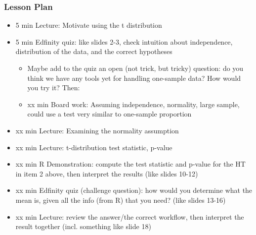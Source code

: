 \begin{frame}
    \frametitle{Lesson Plan}
    \begin{itemize}
        \item 5 min Lecture: Motivate using the t distribution
        \item 5 min Edfinity quiz: like slides 2-3, check intuition about independence, distribution of the data, and the correct hypotheses
        \begin{itemize} 
            \item Maybe add to the quiz an open (not trick, but tricky) question: do you think we have any tools yet for handling one-sample data? How would you try it? Then:
            \item xx min Board work: Assuming independence, normality, large sample, could use a test very similar to one-sample proportion
        \end{itemize}
        \item xx min Lecture: Examining the normality assumption
        \item xx min Lecture: t-distribution test statistic, p-value
        \item xx min R Demonstration: compute the test statistic and p-value for the HT in item 2 above, then interpret the results (like slides 10-12)
        \item xx min Edfinity quiz (challenge question): how would you determine what the mean is, given all the info (from R) that you need? (like slides 13-16)
        \item xx min Lecture: review the answer/the correct workflow, then interpret the result together (incl. something like slide 18)
    \end{itemize}
\end{frame}
            
